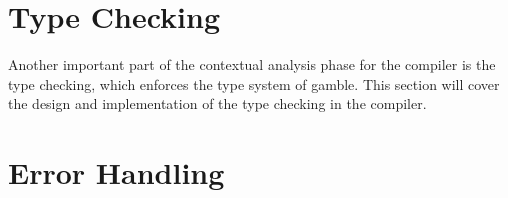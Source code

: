 \section{Type Checking}
Another important part of the contextual analysis phase for the compiler is the type checking, which enforces the type system of \gls{gamble}.
This section will cover the design and implementation of the type checking in the compiler.


\section{Error Handling}
